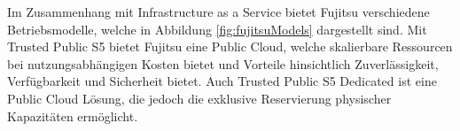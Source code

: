Im Zusammenhang mit Infrastructure as a Service bietet Fujitsu verschiedene Betriebsmodelle\cite{fujitsuIaaS}, welche in Abbildung \ref{fig:fujitsuModels} dargestellt sind. Mit Trusted Public S5 bietet Fujitsu eine Public Cloud, welche skalierbare Ressourcen bei nutzungsabhängigen Kosten bietet und Vorteile hinsichtlich Zuverlässigkeit, Verfügbarkeit und Sicherheit bietet. Auch Trusted Public S5 Dedicated ist eine Public Cloud Lösung, die jedoch die exklusive Reservierung physischer Kapazitäten ermöglicht. 
